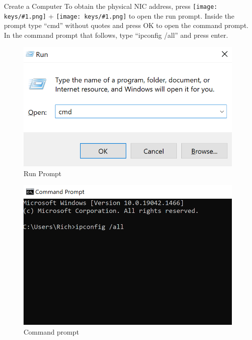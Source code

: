 \documentclass[fleqn]{beamer}
\newcommand{\quotes}[1]{``#1''}
\newcommand{\drawkey}[1]{%
  \begingroup\normalfont
  \texttt{[image: keys/\#1.png]}%
  \endgroup
}
\begin{document}
\begin{frame}{Create a Computer}
    To obtain the physical NIC address, press \drawkey{win} + \drawkey{R} to open the run prompt. Inside the prompt type \quotes{cmd} without quotes and press OK to open the command prompt. In the command prompt that follows, type \quotes{ipconfig /all} and press enter.
    \begin{multicols}{2}
        \begin{figure}
            \centering
            \includegraphics[scale=.5]{figures/runcmd.png}
            \caption{Run Prompt}
            \label{fig:my_label}
        \end{figure}
        \begin{figure}
            \centering
            \includegraphics[scale=.5]{figures/cmd.png}
            \caption{Command prompt}
            \label{fig:my_label}
        \end{figure}
    \end{multicols}
\end{frame}
\end{document}
